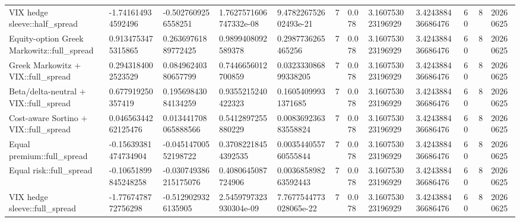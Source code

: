 \begin{tabular}{llllllllllll}
VIX hedge sleeve::half\_spread & -1.741614934592496 & -0.5027609256558251 & 1.7627571606747332e-08 & 9.478226752602493e-21 & 7 & 0.078 & 3.160753023196929 & 3.424388436686476 & 60 & 8 & 20260625 \\
Equity-option Greek Markowitz::full\_spread & 0.9134753475315865 & 0.26369761889772425 & 0.9899408092589378 & 0.2987736265465256 & 7 & 0.078 & 3.160753023196929 & 3.424388436686476 & 60 & 8 & 20260625 \\
Greek Markowitz + VIX::full\_spread & 0.2943184002523529 & 0.08496240380657799 & 0.7446656012700859 & 0.032333086899338205 & 7 & 0.078 & 3.160753023196929 & 3.424388436686476 & 60 & 8 & 20260625 \\
Beta/delta-neutral + VIX::full\_spread & 0.677919250357419 & 0.19569843084134259 & 0.9355215240422323 & 0.16054099931371685 & 7 & 0.078 & 3.160753023196929 & 3.424388436686476 & 60 & 8 & 20260625 \\
Cost-aware Sortino + VIX::full\_spread & 0.04656344262125476 & 0.013441708065888566 & 0.5412897255880229 & 0.008369236383558824 & 7 & 0.078 & 3.160753023196929 & 3.424388436686476 & 60 & 8 & 20260625 \\
Equal premium::full\_spread & -0.15639381474734904 & -0.04514700552198722 & 0.37082218454392535 & 0.003544055760555844 & 7 & 0.078 & 3.160753023196929 & 3.424388436686476 & 60 & 8 & 20260625 \\
Equal risk::full\_spread & -0.10651899845248258 & -0.030749386215175076 & 0.4080645087724906 & 0.003685898263592443 & 7 & 0.078 & 3.160753023196929 & 3.424388436686476 & 60 & 8 & 20260625 \\
VIX hedge sleeve::full\_spread & -1.7767478772756298 & -0.5129029326135905 & 2.5459797323930304e-09 & 7.7677544773028065e-22 & 7 & 0.078 & 3.160753023196929 & 3.424388436686476 & 60 & 8 & 20260625 \\
\bottomrule
\end{tabular}
